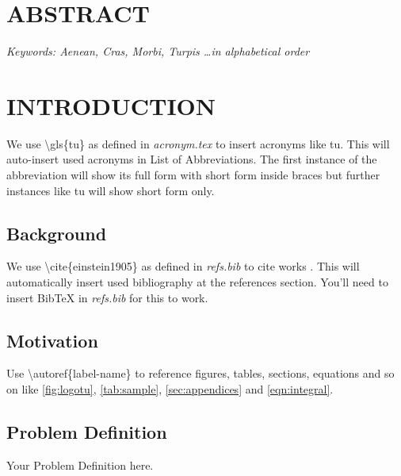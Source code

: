 \documentclass{ioereport}
\begin{document}
    \pagebreak

    
\section*{ABSTRACT}
    \lipsum[1]
    
    \textit{Keywords: Aenean, Cras, Morbi, Turpis \dots in alphabetical order}

    \pagebreak

    \tableofcontents
    \pagebreak

    \listoffigures
    \pagebreak

    \listoftables
    \pagebreak
    
    \printglossary[type=\acronymtype,style=acronyms-only,title=List of Abbreviations{\vspace{0.5\baselineskip}}]
    \pagebreak
    

\mainsection
\section{\MakeUppercase{Introduction}}
    We use \textbackslash gls\{tu\} as defined in \textit{acronym.tex} to insert acronyms like \gls{tu}. This will auto-insert used acronyms in List of Abbreviations. The first instance of the abbreviation will show its full form with short form inside braces but further instances like \gls{tu} will show short form only.
    \subsection{Background}
    We use \textbackslash cite\{einstein1905\} as defined in \textit{refs.bib} to cite works \cite{einstein1905}. This will automatically insert used bibliography at the references section. You'll need to insert BibTeX in \textit{refs.bib} for this to work.
    \subsection{Motivation}
    Use \textbackslash autoref\{label-name\} to reference figures, tables, sections, equations and so on like \autoref{fig:logotu}, \autoref{tab:sample}, \autoref{sec:appendices} and \autoref{eqn:integral}.
    \subsection{Problem Definition}
    Your Problem Definition here.
\end{document}
